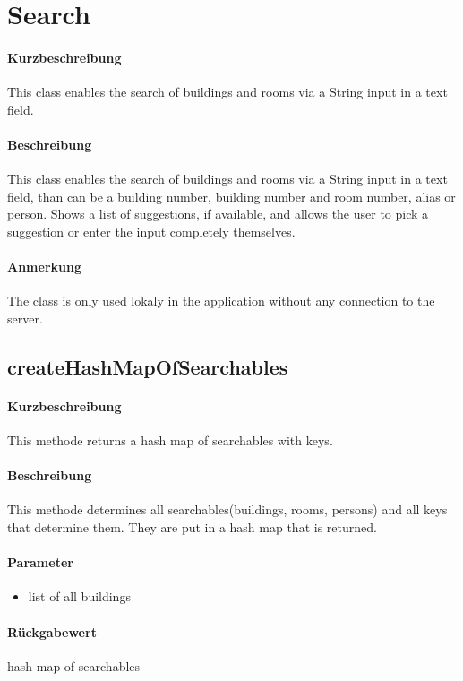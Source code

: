 \section{Search}
\paragraph*{Kurzbeschreibung}
This class enables the search of buildings and rooms via a String input in a text field.
\paragraph*{Beschreibung}
This class enables the search of buildings and rooms via a String input in a text field, 
than can be a building number, building number and room number, alias or person.
Shows a list of suggestions, if available, and allows the user to pick a suggestion or enter the input completely themselves.
\paragraph*{Anmerkung}
The class is only used lokaly in the application without any connection to the server.

\subsection{createHashMapOfSearchables}%
\paragraph*{Kurzbeschreibung}
This methode returns a hash map of searchables with keys.
\paragraph*{Beschreibung}
This methode determines all searchables(buildings, rooms, persons) and all keys that determine them. 
They are put in a hash map that is returned.
\paragraph*{Parameter}
\begin{itemize}
    \item list of all buildings
\end{itemize}
\paragraph*{Rückgabewert}
hash map of searchables

